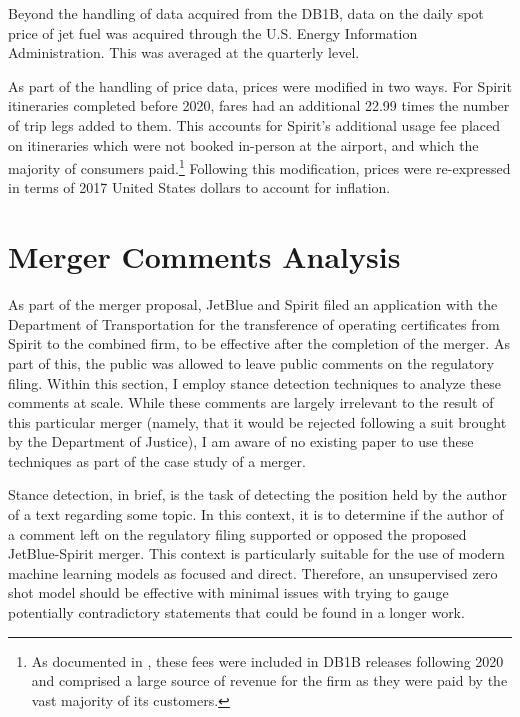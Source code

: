 \documentclass{article}
\begin{document}
\begin{appendices}
	Beyond the handling of data acquired from the DB1B, data on the daily spot price of jet fuel was acquired through the U.S. Energy Information Administration. This was averaged at the quarterly level. 
	
	As part of the handling of price data, prices were modified in two ways. For Spirit itineraries completed before 2020, fares had an additional 22.99 times the number of trip legs added to them. This accounts for Spirit's additional usage fee placed on itineraries which were not booked in-person at the airport, and which the majority of consumers paid.\footnote{As documented in \citet{shrago_spirit_2024}, these fees were included in DB1B releases following 2020 and comprised a large source of revenue for the firm as they were paid by the vast majority of its customers.} Following this modification, prices were re-expressed in terms of 2017 United States dollars to account for inflation.

    \FloatBarrier
	\section{Merger Comments Analysis}
	\label{sec:NaturalLanguage}

As part of the merger proposal, JetBlue and Spirit filed an application with the Department of Transportation for the transference of operating certificates from Spirit to the combined firm, to be effective after the completion of the merger. As part of this, the public was allowed to leave public comments on the regulatory filing. Within this section, I employ stance detection techniques to analyze these comments at scale. While these comments are largely irrelevant to the result of this particular merger (namely, that it would be rejected following a suit brought by the Department of Justice), I am aware of no existing paper to use these techniques as part of the case study of a merger. 

Stance detection, in brief, is the task of detecting the position held by the author of a text regarding some topic. In this context, it is to determine if the author of a comment left on the regulatory filing supported or opposed the proposed JetBlue-Spirit merger. This context is particularly suitable for the use of modern machine learning models as focused and direct. Therefore, an unsupervised zero shot model should be effective with minimal issues with trying to gauge potentially contradictory statements that could be found in a longer work. 


\end{appendices}
\end{document}
